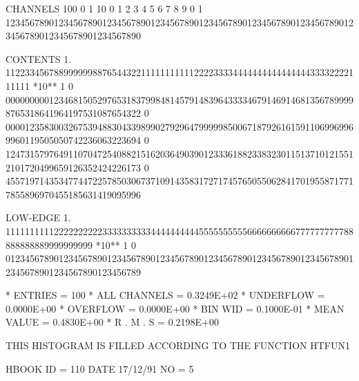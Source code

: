 \begin{Listing}
 CHANNELS 100   0                                                                                                  1   
           10   0        1         2         3         4         5         6         7         8         9         0   
            1   1234567890123456789012345678901234567890123456789012345678901234567890123456789012345678901234567890   
 
 CONTENTS   1.                 11223345678899999988765443221111111111122223333444444444444444433332222111111        
 *10**  1   0   0000000001234681505297653183799848145791483964333346791469146813567899998765318641964197531087654322
            0   0000123583003267539488304339899027929647999998500671879261615911069969969960119505050742236063223694
            0   1247315797649110704725408821516203649039012333618823383230115137101215512101720499659126352424226173
            0   4557197143534774472257850306737109143583172717457650550628417019558717717855896970455185631419095996
 
 LOW-EDGE   1.            111111111122222222223333333333444444444455555555556666666666777777777788888888889999999999
 *10**  1   0   0123456789012345678901234567890123456789012345678901234567890123456789012345678901234567890123456789
 
 * ENTRIES =        100      * ALL CHANNELS = 0.3249E+02      * UNDERFLOW = 0.0000E+00      * OVERFLOW = 0.0000E+00
 * BIN WID = 0.1000E-01      * MEAN VALUE   = 0.4830E+00      * R . M . S = 0.2198E+00
 
\newpage
 THIS HISTOGRAM IS FILLED ACCORDING TO THE FUNCTION HTFUN1                       
 
 HBOOK     ID =       110                                        DATE  17/12/91              NO =   5
 

\end{Listing}
